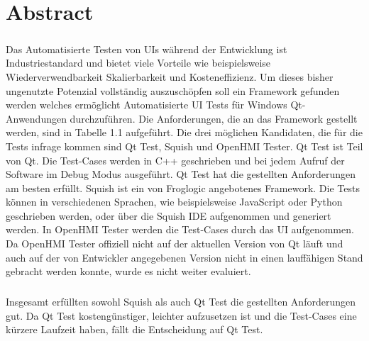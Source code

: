 \chapter*{Abstract}
\thispagestyle{empty}

	\paragraph{} Das Automatisierte Testen von UIs während der Entwicklung ist Industriestandard und bietet viele Vorteile wie beispielsweise Wiederverwendbarkeit Skalierbarkeit und Kosteneffizienz. Um dieses bisher ungenutzte Potenzial vollständig auszuschöpfen soll ein Framework gefunden werden welches ermöglicht Automatisierte UI Tests für Windows Qt-Anwendungen durchzuführen. Die Anforderungen, die an das Framework gestellt werden, sind in Tabelle 1.1 aufgeführt. Die drei möglichen Kandidaten, die für die Tests infrage kommen sind Qt Test, Squish und OpenHMI Tester. Qt Test ist Teil von Qt. Die Test-Cases werden in C++ geschrieben und bei jedem Aufruf der Software im Debug Modus ausgeführt. Qt Test hat die gestellten Anforderungen am besten erfüllt. Squish ist ein von Froglogic angebotenes Framework. Die Tests können in verschiedenen Sprachen, wie beispielsweise JavaScript oder Python geschrieben werden, oder über die Squish IDE aufgenommen und generiert werden. In OpenHMI Tester werden die Test-Cases durch das UI aufgenommen. Da OpenHMI Tester offiziell nicht auf der aktuellen Version von Qt läuft und auch auf der von Entwickler angegebenen Version nicht in einen lauffähigen Stand gebracht werden konnte, wurde es nicht weiter evaluiert.
	
	\paragraph{} Insgesamt erfüllten sowohl Squish als auch Qt Test die gestellten Anforderungen gut. Da Qt Test kostengünstiger, leichter aufzusetzen ist und die Test-Cases eine kürzere Laufzeit haben, fällt die Entscheidung auf Qt Test.


\bigskip
